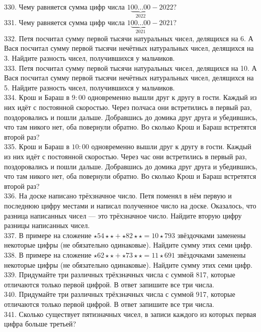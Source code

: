\documentclass[12pt]{article}
\begin{document}
330. Чему равняется сумма цифр числа $1\underbrace{00\ldots00}_{2022}-2022?$\\
331. Чему равняется сумма цифр числа $1\underbrace{00\ldots00}_{2021}-2021?$\\
332. Петя посчитал сумму первой тысячи натуральных чисел, делящихся на 6. А Вася посчитал сумму первой тысячи нечётных натуральных чисел, делящихся на 3. Найдите разность чисел, получившихся у мальчиков.\\
333. Петя посчитал сумму первой тысячи натуральных чисел, делящихся на 10. А Вася посчитал сумму первой тысячи нечётных натуральных чисел, делящихся на 5. Найдите разность чисел, получившихся у мальчиков.\\
334. Крош и Бараш в $9:00$ одновременно вышли друг к другу в гости. Каждый из них идёт с постоянной скоростью. Через полчаса они встретились в первый раз, поздоровались и пошли дальше. Добравшись до домика друг друга и убедившись, что там никого нет, оба повернули обратно. Во сколько Крош и Бараш встретятся второй раз?\\
335. Крош и Бараш в $10:00$ одновременно вышли друг к другу в гости. Каждый из них идёт с постоянной скоростью. Через час они встретились в первый раз, поздоровались и пошли дальше. Добравшись до домика друг друга и убедившись, что там никого нет, оба повернули обратно. Во сколько Крош и Бараш встретятся второй раз?\\
336. На доске написано трёхзначное число. Петя поменял в нём первую и последнюю цифру местами и написал полученное число на доске. Оказалось, что разница написанных чисел --- это трёхзначное число. Найдите вторую цифру разницы написанных чисел.\\
337. В примере на сложение $\star54\star\star+\star82\star\star=10\star793$ звёздочками заменены некоторые цифры (не обязательно одинаковые). Найдите сумму этих семи цифр.\\
338. В примере на сложение $\star62\star\star+\star73\star\star=11\star691$ звёздочками заменены некоторые цифры (не обязательно одинаковые). Найдите сумму этих семи цифр.\\
339. Придумайте три различных трёхзначных числа с суммой 817, которые отличаются только первой цифрой. В ответ запишите все три числа.\\
340. Придумайте три различных трёхзначных числа с суммой 917, которые отличаются только первой цифрой. В ответ запишите все три числа.\\
341. Сколько существует пятизначных чисел, в записи каждого из которых первая цифра больше третьей?\\
\end{document}
